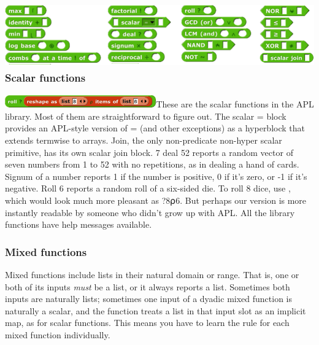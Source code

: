 \subsubsection[Scalar
functions]{\texorpdfstring{\protect\includegraphics[width=5.73333in,height=1.10667in]{media/image1265.png}Scalar
functions}{Scalar functions}}\label{scalar-functions}

\includegraphics[width=2.56667in,height=0.21667in]{media/image1266.png}These
are the scalar functions in the APL library. Most of them are
straightforward to figure out. The scalar = block provides an APL-style
version of = (and other exceptions) as a hyperblock that extends
termwise to arrays. Join, the only non-predicate non-hyper scalar
primitive, has its own scalar join block. 7 deal 52 reports a random
vector of seven numbers from 1 to 52 with no repetitions, as in dealing
a hand of cards. Signum of a number reports 1 if the number is positive,
0 if it's zero, or -1 if it's negative. Roll 6 reports a random roll of
a six-sided die. To roll 8 dice, use , which would look much more
pleasant as ?8⍴6. But perhaps our version is more instantly readable by
someone who didn't grow up with APL. All the library functions have help
messages available.

\subsubsection{Mixed functions}\label{mixed-functions}

Mixed functions include lists in their natural domain or range. That is,
one or both of its inputs \emph{must} be a list, or it always reports a
list. Sometimes both inputs are naturally lists; sometimes one input of
a dyadic mixed function is naturally a scalar, and the function treats a
list in that input slot as an implicit map, as for scalar functions.
This means you have to learn the rule for each mixed function
individually.

